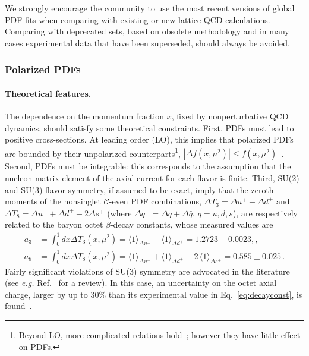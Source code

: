 We strongly encourage the community to use the most recent versions
of global PDF fits when comparing with existing or new
lattice QCD calculations.
%
Comparing with deprecated sets, based on obsolete methodology
and in many cases experimental data that have been
superseded, should always be avoided.

\subsubsection{Polarized PDFs}
\label{sec:polPDFs}

\paragraph*{Theoretical features.}

The dependence on the momentum fraction $x$, fixed by nonperturbative QCD 
dynamics, should satisfy some theoretical constraints.
%
First, PDFs must lead to positive cross-sections.
At leading order (LO), this implies that polarized 
PDFs are bounded by their unpolarized counterparts\footnote{Beyond LO, more 
complicated relations hold~\cite{Altarelli:1998gn}; however they have little
effect on PDFs.}, $|\Delta f(x,\mu^2)|\leq f(x,\mu^2)$~\cite{Altarelli:1998gn}.
%
Second, PDFs must be integrable: this corresponds to the assumption 
that the nucleon matrix element of the axial current for each flavor is finite.
%
Third, SU(2) and SU(3) flavor symmetry, if assumed to be exact, imply that 
the zeroth moments of the nonsinglet $\mathcal{C}$-even PDF combinations,
$\Delta T_3=\Delta u^+ -\Delta d^+$ and 
$\Delta T_8 = \Delta u^+ +\Delta d^+ -2\Delta s^+$ 
(where $\Delta q^+=\Delta q+\Delta\bar{q}$, $q=u,d,s$), are respectively
related to the baryon octet $\beta$-decay constants, whose 
measured values are~\cite{Olive:2016xmw}
\begin{align}
 a_3
 & =
 \int_0^1 dx \Delta T_3 (x,\mu^2)
 = \langle 1\rangle_{\Delta u^+} - \langle 1\rangle_{\Delta d^+}  = 1.2723 \pm 0.0023
 ,,\\
 a_8
 & =
 \int_0^1 dx \Delta T_8 (x,\mu^2)
 = \langle 1 \rangle_{\Delta u^+} + \langle 1 \rangle_{\Delta d^+} -2\,\langle 1 \rangle_{\Delta s^+} 
 =0.585  \pm 0.025
 \,.
\label{eq:decayconst}
\end{align}
%
Fairly significant violations of SU(3) symmetry are advocated
in the literature (see {\it e.g.} Ref.~\cite{Cabibbo:2003cu} for a review). 
%
In this case, an uncertainty on the octet axial charge, larger by up to $30\%$ 
than its experimental value in Eq.~\eqref{eq:decayconst}, 
is found~\cite{FloresMendieta:1998ii}. 


